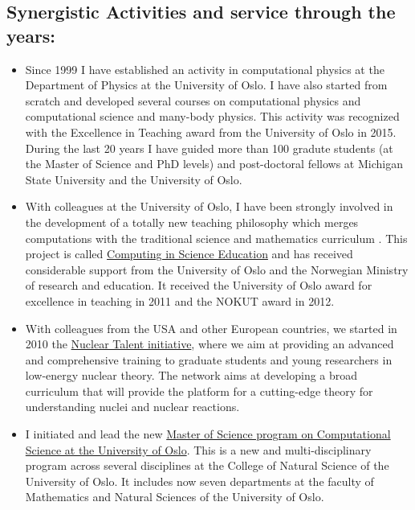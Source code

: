 \documentclass[%
oneside,                 %
final,                   %
10pt]{article}
\begin{document}
\noindent
\subsection{Synergistic Activities and service through the years:}

\begin{itemize}
\item Since 1999 I have   established an activity in computational physics  at the  Department of Physics at the University of Oslo. I have also started from scratch and developed several  courses on computational physics and computational science and many-body physics. This activity was recognized with the Excellence in Teaching award from the University of Oslo in 2015. During the last 20 years I have guided  more than 100 gradute students (at the Master of Science and PhD levels) and post-doctoral fellows at Michigan State University and the University of Oslo.

\item With colleagues at the University of Oslo, I have   been strongly involved in the development of a totally new teaching philosophy which merges computations with the traditional science and mathematics curriculum . This project is called \href{{http://www.mn.uio.no/english/about/collaboration/cse/}}{Computing in Science Education} and has received considerable support from the University of Oslo and the Norwegian Ministry of research and education.  It received the University of Oslo award for excellence in teaching  in 2011 and the NOKUT award in 2012. 

\item With colleagues from the USA and other European countries, we started in 2010 the \href{{http://www.nucleartalent.org}}{Nuclear Talent initiative},  where we aim  at providing an advanced and comprehensive training to graduate students and young researchers in low-energy nuclear theory.  The network aims at developing a broad curriculum that will provide the platform for a cutting-edge theory for understanding nuclei and nuclear reactions.  

\item I initiated and lead the new \href{{http://www.uio.no/english/studies/programmes/computational-science-master/}}{Master of Science program on Computational Science at the University of Oslo}. This is a new and multi-disciplinary program across several disciplines at the College of Natural Science of the University of Oslo. It includes now seven  departments at the faculty of Mathematics and Natural Sciences of  the University of Oslo.
\end{itemize}
\end{document}
